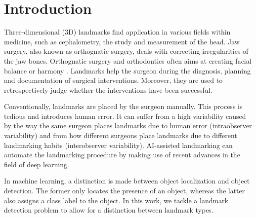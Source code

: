 
% 

 
 




\section{Introduction}
\label{sec:introduction}
Three-dimensional (3D) landmarks find application in various fields within medicine, such as cephalometry, the study and measurement of the head. Jaw surgery, also known as orthognatic surgery, deals with correcting irregularities of the jaw bones. Orthognatic surgery and orthodontics often aims at creating facial balance or harmony \cite{Plooij2009}. Landmarks help the surgeon during the diagnosis, planning and documentation of surgical interventions. Moreover, they are used to retrospectively judge whether the interventions have been successful. 

Conventionally, landmarks are placed by the surgeon manually. This process is tedious and introduces human error. It can suffer from a high variability caused by the way the same surgeon places landmarks due to human error (intraobserver variability) and from how different surgeons place landmarks due to different landmarking habits (interobserver variability).
AI-assisted landmarking can automate the landmarking procedure by making use of recent advances in the field of deep learning.

In machine learning, a distinction is made between object localization and object detection. The former only locates the presence of an object, whereas the latter also assigns a class label to the object. In this work, we tackle a landmark detection problem to allow for a distinction between landmark types.

